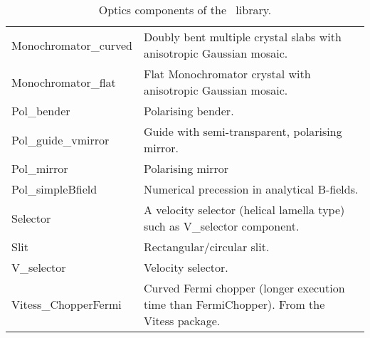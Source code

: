 \begin{table}
\begin{center}
{\begin{tabular}{|p{}|p{}|}
 Monochromator\_curved & Doubly bent multiple crystal
                      slabs with anisotropic Gaussian mosaic. \\
 Monochromator\_flat &  Flat Monochromator crystal with
                      anisotropic Gaussian mosaic. \\
 Pol\_bender & Polarising bender. \\
 Pol\_guide\_vmirror & Guide with semi-transparent, polarising mirror. \\
 Pol\_mirror        & Polarising mirror \\
 Pol\_simpleBfield  & Numerical precession in analytical B-fields. \\
 Selector            & A velocity selector (helical lamella type) such as
                      V\_selector component. \\
 Slit                & Rectangular/circular
                      slit. \\
 V\_selector          & Velocity selector. \\
 Vitess\_ChopperFermi & Curved Fermi chopper (longer execution time than FermiChopper).
                     From the Vitess package.\\ \hline
    \end{tabular}
    \caption{Optics components of the \MCS\ library.}
    \label{t:comp-optics}
    }
  \end{center}
\end{table}

